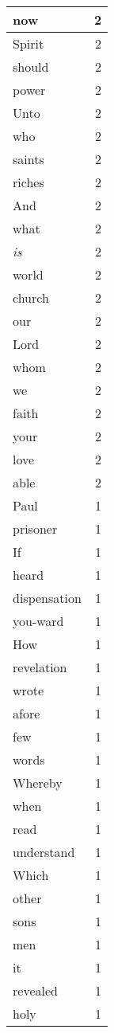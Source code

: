 \begin{center}
\begin{longtable}{l|r}
now & 2\\ \hline 
Spirit & 2\\ \hline 
should & 2\\ \hline 
power & 2\\ \hline 
Unto & 2\\ \hline 
who & 2\\ \hline 
saints & 2\\ \hline 
riches & 2\\ \hline 
And & 2\\ \hline 
what & 2\\ \hline 
\emph{is} & 2\\ \hline 
world & 2\\ \hline 
church & 2\\ \hline 
our & 2\\ \hline 
Lord & 2\\ \hline 
whom & 2\\ \hline 
we & 2\\ \hline 
faith & 2\\ \hline 
your & 2\\ \hline 
love & 2\\ \hline 
able & 2\\ \hline 
Paul & 1\\ \hline 
prisoner & 1\\ \hline 
If & 1\\ \hline 
heard & 1\\ \hline 
dispensation & 1\\ \hline 
you-ward & 1\\ \hline 
How & 1\\ \hline 
revelation & 1\\ \hline 
wrote & 1\\ \hline 
afore & 1\\ \hline 
few & 1\\ \hline 
words & 1\\ \hline 
Whereby & 1\\ \hline 
when & 1\\ \hline 
read & 1\\ \hline 
understand & 1\\ \hline 
Which & 1\\ \hline 
other & 1\\ \hline 
sons & 1\\ \hline 
men & 1\\ \hline 
it & 1\\ \hline 
revealed & 1\\ \hline 
holy & 1\\ \hline 

\end{longtable}
\end{center}
